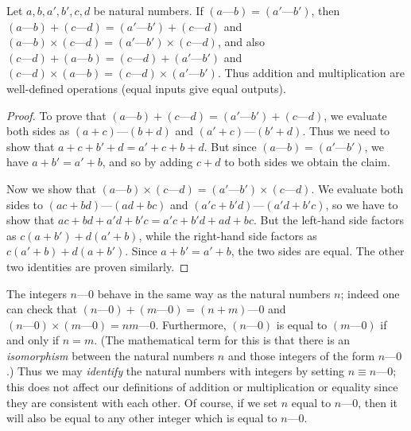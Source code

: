 \begin{lem}\label{4.1.3}
  Let \(a, b, a', b', c, d\) be natural numbers.
  If \((a \text{---} b) = (a' \text{---} b')\), then \((a \text{---} b) + (c \text{---} d) = (a' \text{---} b') + (c \text{---} d)\) and \((a \text{---} b) \times (c \text{---} d) = (a' \text{---} b') \times (c \text{---} d)\), and also \((c \text{---} d) + (a \text{---} b) = (c \text{---} d) + (a' \text{---} b')\) and \((c \text{---} d) \times (a \text{---} b) = (c \text{---} d) \times (a' \text{---} b')\).
  Thus addition and multiplication are well-defined operations (equal inputs give equal outputs).
\end{lem}

\begin{proof}
  To prove that \((a \text{---} b) + (c \text{---} d) = (a' \text{---} b') + (c \text{---} d)\), we evaluate both sides as \((a + c) \text{---} (b + d)\) and \((a' + c) \text{---} (b' + d)\).
  Thus we need to show that \(a + c + b' + d = a' + c + b + d\).
  But since \((a \text{---} b) = (a' \text{---} b')\), we have \(a + b' = a' + b\), and so by adding \(c + d\) to both sides we obtain the claim.

  Now we show that \((a \text{---} b) \times (c \text{---} d) = (a' \text{---} b') \times (c \text{---} d)\).
  We evaluate both sides to \((ac + bd) \text{---} (ad + bc)\) and \((a'c + b'd) \text{---} (a'd + b'c)\), so we have to show that \(ac + bd + a'd + b'c = a'c + b'd + ad + bc\).
  But the left-hand side factors as \(c(a + b') + d(a' + b)\), while the right-hand side factors as \(c(a' + b) + d(a + b')\).
  Since \(a + b' = a' + b\), the two sides are equal.
  The other two identities are proven similarly.
\end{proof}

\begin{note}
  The integers \(n \text{---} 0\) behave in the same way as the natural numbers \(n\);
  indeed one can check that \((n \text{---} 0) + (m \text{---} 0) = (n + m) \text{---} 0\) and \((n \text{---} 0) \times (m \text{---} 0) = nm \text{---} 0\).
  Furthermore, \((n \text{---} 0)\) is equal to \((m \text{---} 0)\) if and only if \(n = m\).
  (The mathematical term for this is that there is an \emph{isomorphism} between the natural numbers \(n\) and those integers of the form \(n \text{---} 0\).)
  Thus we may \emph{identify} the natural numbers with integers by setting \(n \equiv n \text{---} 0\);
  this does not affect our definitions of addition or multiplication or equality since they are consistent with each other.
  Of course, if we set \(n\) equal to \(n \text{---} 0\), then it will also be equal to any other integer which is equal to \(n \text{---} 0\).
\end{note}


